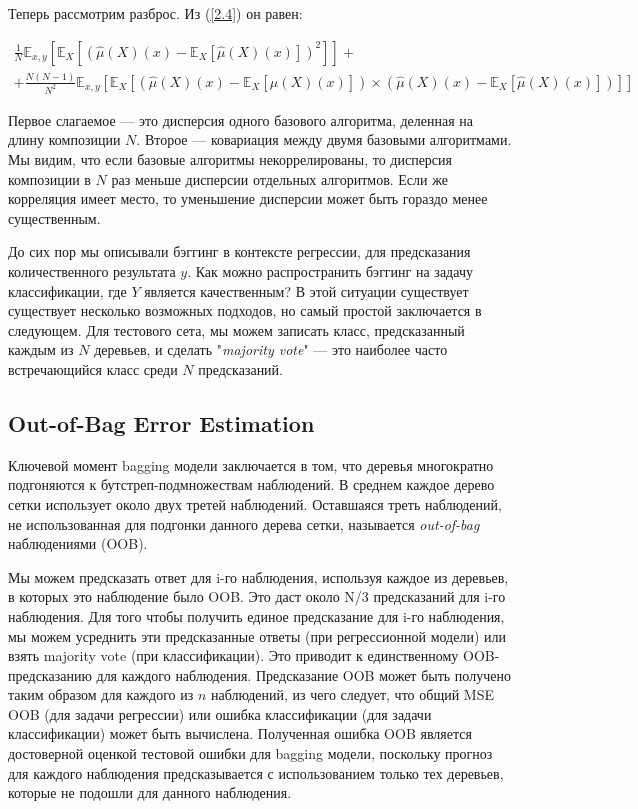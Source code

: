 \documentclass{article}
\theoremstyle{definition}
\theoremstyle{theorem}
\theoremstyle{remark}
\theoremstyle{theorem}
\theoremstyle{example}
\theoremstyle{theorem}
\theoremstyle{theorem}
\theoremstyle{theorem}
\theoremstyle{theorem}
\begin{document}
Теперь рассмотрим разброс. Из (\ref{2.4}) он равен:

\begin{multline}
	\frac{1}{N}\mathbb{E}_{x,y}\left[\mathbb{E}_X\left[\left(\hat{\mu}(X)(x)-\mathbb{E}_X[\hat{\mu}(X)(x)]\right)^2\right]\right] + \\ + 
	\frac{N(N-1)}{N^2}\mathbb{E}_{x,y}\left[\mathbb{E}_X\left[\left(\hat{\mu}(X)(x)-\mathbb{E}_X[\hat{\mu}(X)(x)]\right)\times \left(\hat{\mu}(X)(x)-\mathbb{E}_X[\hat{\mu}(X)(x)]\right)\right]\right]
\end{multline}

Первое слагаемое — это дисперсия одного базового алгоритма, деленная на длину композиции $N.$ Второе --- ковариация между двумя базовыми алгоритмами. Мы видим, что если базовые алгоритмы некоррелированы, то дисперсия композиции в $N$ раз меньше дисперсии отдельных алгоритмов. Если же корреляция имеет место, то уменьшение дисперсии может быть гораздо менее существенным.

До сих пор мы описывали бэггинг в контексте регрессии, для предсказания количественного результата $y$. Как можно распространить бэггинг на задачу классификации, где $Y$ является качественным? В этой ситуации существует существует несколько возможных подходов, но самый простой заключается в следующем. Для тестового сета, мы можем записать класс, предсказанный каждым из $N$ деревьев, и сделать "\textit{majority vote}" --- это наиболее часто встречающийся класс среди $N$ предсказаний.

\subsection{Out-of-Bag Error Estimation}

Ключевой момент bagging модели заключается в том, что деревья многократно подгоняются к бутстреп-подмножествам наблюдений. В среднем каждое дерево сетки использует около двух третей наблюдений. Оставшаяся треть наблюдений, не использованная для подгонки данного дерева сетки, называется \textit{out-of-bag} наблюдениями (OOB).

Мы можем предсказать ответ для i-го наблюдения, используя каждое из деревьев, в которых это наблюдение было OOB. Это даст около N/3 предсказаний для i-го наблюдения. Для того чтобы получить единое предсказание для i-го  наблюдения, мы можем усреднить эти предсказанные ответы (при регрессионной модели) или взять majority vote (при классификации). Это приводит к единственному OOB-предсказанию для каждого наблюдения. Предсказание OOB может быть получено таким образом для каждого из $n$ наблюдений, из чего следует, что общий MSE OOB (для задачи регрессии) или ошибка классификации (для задачи классификации) может быть вычислена. Полученная ошибка OOB является достоверной оценкой тестовой ошибки для bagging модели, поскольку прогноз для каждого наблюдения предсказывается с использованием только тех деревьев, которые не подошли для данного наблюдения. 
\end{document}
